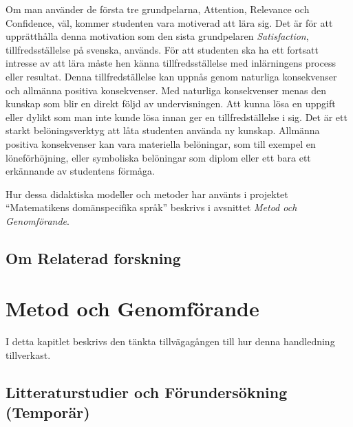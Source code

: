 \documentclass[]{article}
\begin{document}
Om man använder de första tre grundpelarna, Attention, Relevance och Confidence,
väl, kommer studenten vara motiverad att lära sig.
Det är för att upprätthålla denna motivation som den sista grundpelaren
\textit{Satisfaction}, tillfredsställelse på svenska, används.
För att studenten ska ha ett fortsatt intresse av att lära måste hen känna
tillfredsställelse med inlärningens process eller resultat.
Denna tillfredställelse kan uppnås genom naturliga konsekvenser och allmänna positiva
konsekvenser. Med naturliga konsekvenser menas den kunskap som blir
en direkt följd av undervisningen. Att kunna lösa en uppgift eller dylikt
som man inte kunde lösa innan ger en tillfredställelse i sig.
Det är ett starkt belöningsverktyg att låta studenten använda ny kunskap.
Allmänna  positiva konsekvenser kan vara materiella belöningar,
som till exempel en löneförhöjning, eller symboliska belöningar som diplom
eller ett bara ett erkännande av studentens förmåga.

Hur dessa didaktiska modeller och metoder har använts i projektet
``Matematikens domänspecifika språk'' beskrivs i avsnittet
\textit{Metod och Genomförande}.

\subsection{Om Relaterad forskning}

\section{Metod och Genomförande}



I detta kapitlet beskrivs den tänkta tillvägagången till hur denna
handledning tillverkast.

\subsection{Litteraturstudier och Förundersökning (Temporär)}

\end{document}
